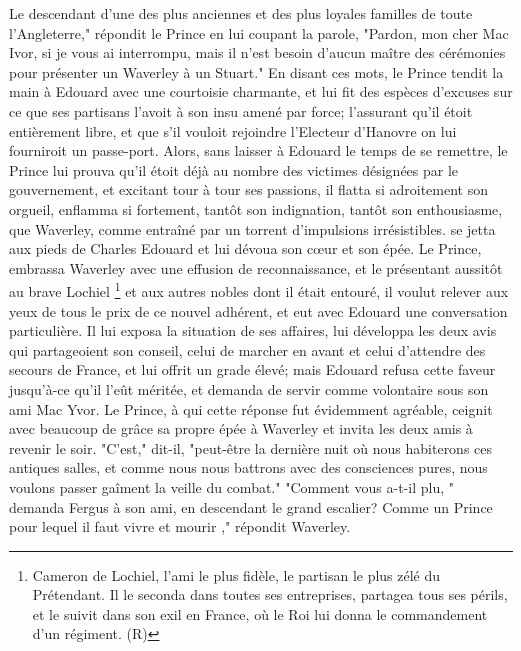 Le descendant d'une des plus anciennes et des plus loyales familles de toute l'Angleterre," répondit le Prince en lui coupant la parole, "Pardon, mon cher Mac Ivor, si je vous ai interrompu, mais il n'est besoin d'aucun maître des cérémonies pour présenter un Waverley à un Stuart."
En disant ces mots, le Prince tendit la main à Edouard avec une courtoisie charmante, et lui fit des espèces d'excuses sur ce que ses partisans l'avoit à son insu amené par force; l'assurant qu'il étoit entièrement libre, et que s'il vouloit rejoindre l'Electeur d'Hanovre on lui fourniroit un passe-port. Alors, sans laisser à Edouard le temps de se remettre, le Prince lui prouva qu'il étoit déjà au nombre des victimes désignées par le gouvernement, et excitant tour à tour ses passions, il flatta si adroitement son orgueil, enflamma si fortement, tantôt son indignation, tantôt son enthousiasme, que Waverley, comme entraîné par un torrent d'impulsions irrésistibles.\setcounter{page}{228} se jetta aux pieds de Charles Edouard et lui dévoua son cœur et son épée.
Le Prince, embrassa Waverley avec une effusion de reconnaissance, et le présentant aussitôt au brave Lochiel \footnote{Cameron de Lochiel, l'ami le plus fidèle, le partisan le plus zélé du Prétendant. Il le seconda dans toutes ses entreprises, partagea tous ses périls, et le suivit dans son exil en France, où le Roi lui donna le commandement d'un régiment. (R)} et aux autres nobles dont il était entouré, il voulut relever aux yeux de tous le prix de ce nouvel adhérent, et eut avec Edouard une conversation particulière. Il lui exposa la situation de ses affaires, lui développa les deux avis qui partageoient son conseil, celui de marcher en avant et celui d'attendre des secours de France, et lui offrit un grade élevé; mais Edouard refusa cette faveur jusqu'à-ce qu'il l'eût méritée, et demanda de servir comme volontaire sous son ami Mac Yvor. Le Prince, à qui cette réponse fut évidemment agréable, ceignit avec beaucoup de grâce sa propre épée à Waverley et invita les deux amis à revenir le soir. "C'est," dit-il, "peut-être la dernière nuit où nous habiterons ces antiques salles, et comme nous nous battrons avec des consciences pures, nous voulons passer gaîment la veille du combat."
"Comment vous a-t-il plu, " demanda Fergus à son ami, en descendant le grand escalier?\setcounter{page}{229} Comme un Prince pour lequel il faut vivre et mourir ," répondit Waverley.
